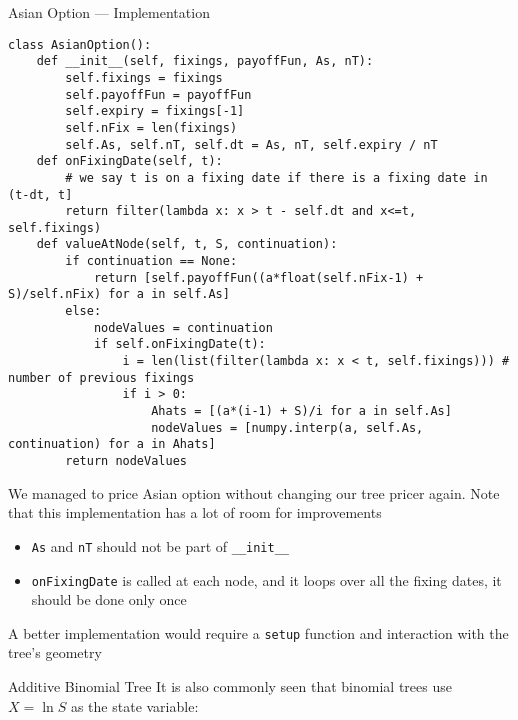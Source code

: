 \begin{frame}[fragile]{Asian Option --- Implementation}
\begin{lstlisting}[style=compactlst]
class AsianOption():
    def __init__(self, fixings, payoffFun, As, nT):
        self.fixings = fixings
        self.payoffFun = payoffFun
        self.expiry = fixings[-1]
        self.nFix = len(fixings)
        self.As, self.nT, self.dt = As, nT, self.expiry / nT
    def onFixingDate(self, t):
        # we say t is on a fixing date if there is a fixing date in (t-dt, t]
        return filter(lambda x: x > t - self.dt and x<=t, self.fixings)
    def valueAtNode(self, t, S, continuation):
        if continuation == None:
            return [self.payoffFun((a*float(self.nFix-1) + S)/self.nFix) for a in self.As]
        else:
            nodeValues = continuation
            if self.onFixingDate(t):
                i = len(list(filter(lambda x: x < t, self.fixings))) # number of previous fixings
                if i > 0:
                    Ahats = [(a*(i-1) + S)/i for a in self.As]
                    nodeValues = [numpy.interp(a, self.As, continuation) for a in Ahats]
        return nodeValues
\end{lstlisting}
\scriptsize
We managed to price Asian option without changing our tree pricer again.
\vfill
Note that this implementation has a lot of room for improvements
\begin{itemize}
\item \verb_As_ and \verb_nT_ should not be part of \verb+__init__+
\item \verb_onFixingDate_ is called at each node, and it loops over all the fixing dates, it should be done only once
\end{itemize}
A better implementation would require a \verb_setup_ function and interaction with the tree's geometry
\end{frame}

\begin{frame}{Additive Binomial Tree}
It is also commonly seen that binomial trees use $X = \ln S$ as the state variable:
\begin{center}
\end{center}
\end{frame}

